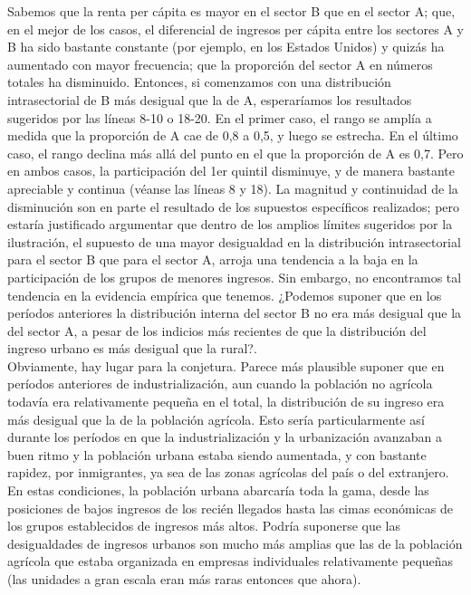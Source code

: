 Sabemos que la renta per cápita es mayor en el sector B que en el sector A; que, en el mejor de los casos, el diferencial de ingresos per cápita entre los sectores A y B ha sido bastante constante (por ejemplo, en los Estados Unidos) y quizás ha aumentado con mayor frecuencia; que la proporción del sector A en números totales ha disminuido. Entonces, si comenzamos con una distribución intrasectorial de B más desigual que la de A, esperaríamos los resultados sugeridos por las líneas 8-10 o 18-20. En el primer caso, el rango se amplía a medida que la proporción de A cae de 0,8 a 0,5, y luego se estrecha. En el último caso, el rango declina más allá del punto en el que la proporción de A es 0,7. Pero en ambos casos, la participación del 1er quintil disminuye, y de manera bastante apreciable y continua (véanse las líneas 8 y 18). La magnitud y continuidad de la disminución son en parte el resultado de los supuestos específicos realizados; pero estaría justificado argumentar que dentro de los amplios límites sugeridos por la ilustración, el supuesto de una mayor desigualdad en la distribución intrasectorial para el sector B que para el sector A, arroja una tendencia a la baja en la participación de los grupos de menores ingresos. Sin embargo, no encontramos tal tendencia en la evidencia empírica que tenemos. ¿Podemos suponer que en los períodos anteriores la distribución interna del sector B no era más desigual que la del sector A, a pesar de los indicios más recientes de que la distribución del ingreso urbano es más desigual que la rural?.\\

Obviamente, hay lugar para la conjetura. Parece más plausible suponer que en períodos anteriores de industrialización, aun cuando la población no agrícola todavía era relativamente pequeña en el total, la distribución de su ingreso era más desigual que la de la población agrícola. Esto sería particularmente así durante los períodos en que la industrialización y la urbanización avanzaban a buen ritmo y la población urbana estaba siendo aumentada, y con bastante rapidez, por inmigrantes, ya sea de las zonas agrícolas del país o del extranjero. En estas condiciones, la población urbana abarcaría toda la gama, desde las posiciones de bajos ingresos de los recién llegados hasta las cimas económicas de los grupos establecidos de ingresos más altos. Podría suponerse que las desigualdades de ingresos urbanos son mucho más amplias que las de la población agrícola que estaba organizada en empresas individuales relativamente pequeñas (las unidades a gran escala eran más raras entonces que ahora).\\

